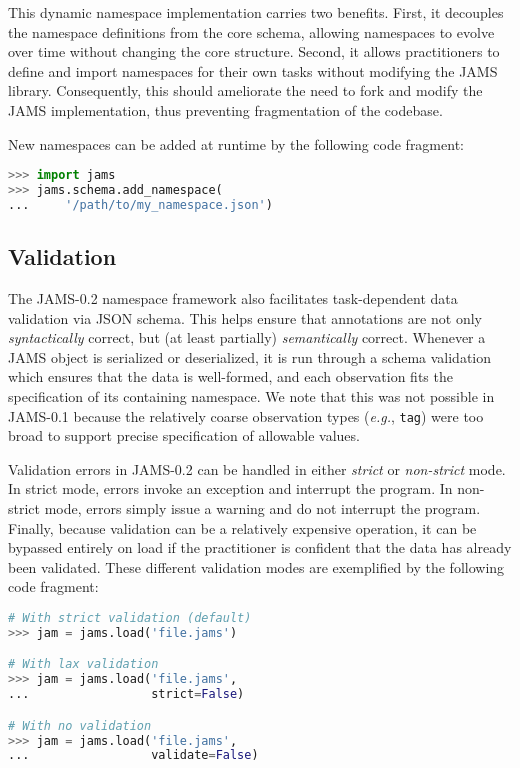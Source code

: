 \documentclass{article}
\begin{document}
This dynamic namespace implementation carries two benefits.  First, it decouples the
namespace definitions from the core schema, allowing namespaces to evolve over
time without changing the core structure.  Second, it allows practitioners to define and
import namespaces for their own tasks without modifying the JAMS library.  Consequently,
this should ameliorate the need to fork and modify the JAMS implementation, thus
preventing fragmentation of the codebase.

New namespaces can be added at runtime by the following code fragment:
\begin{lstlisting}[language=python]
>>> import jams
>>> jams.schema.add_namespace(
...     '/path/to/my_namespace.json')
\end{lstlisting}


\subsection{Validation}\label{sec:imp:validation}
The JAMS-0.2 namespace framework also facilitates task-dependent data validation via 
JSON schema.
This helps ensure that annotations are not only \emph{syntactically} correct, but (at
least partially) \emph{semantically} correct.
Whenever a JAMS object is serialized or deserialized, it is run through a schema
validation which ensures that the data is well-formed, and each observation fits the
specification of its containing namespace.  We note that this was not possible in
JAMS-0.1 because the relatively coarse observation types (\emph{e.g.}, \texttt{tag}) were
too broad to support precise specification of allowable values.

Validation errors in JAMS-0.2 can be handled in either \emph{strict} or \emph{non-strict}
mode.  In strict mode, errors invoke an exception and interrupt the program.  In
non-strict mode, errors simply issue a warning and do not interrupt the program.
Finally, because validation can be a relatively expensive operation, it can be bypassed
entirely on load if the practitioner is confident that the data has already been
validated.  These different validation modes are exemplified by the following code
fragment:

\begin{lstlisting}[language=python]
# With strict validation (default)
>>> jam = jams.load('file.jams')

# With lax validation
>>> jam = jams.load('file.jams',
...                 strict=False)

# With no validation
>>> jam = jams.load('file.jams',
...                 validate=False)
\end{lstlisting}
\end{document}
